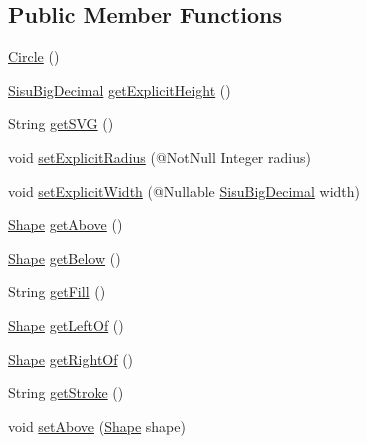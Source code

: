 \subsection*{Public Member Functions}
\begin{DoxyCompactItemize}
\item 
\hyperlink{classcom_1_1aarrelaakso_1_1drawl_1_1_circle_a18cd01a953d72d49941bc8211f50d268}{Circle} ()
\item 
\hyperlink{classcom_1_1aarrelaakso_1_1drawl_1_1_sisu_big_decimal}{Sisu\+Big\+Decimal} \hyperlink{classcom_1_1aarrelaakso_1_1drawl_1_1_circle_a31a2fa475820117ecfbb5c9cd839f0f4}{get\+Explicit\+Height} ()
\item 
String \hyperlink{classcom_1_1aarrelaakso_1_1drawl_1_1_circle_adc826cc2d93eb4e78318035c86d00f03}{get\+S\+VG} ()
\item 
void \hyperlink{classcom_1_1aarrelaakso_1_1drawl_1_1_circle_af34a59acf0e1fc33777aca1b9be7b23d}{set\+Explicit\+Radius} (@Not\+Null Integer radius)
\item 
void \hyperlink{classcom_1_1aarrelaakso_1_1drawl_1_1_circle_a6b4fd174602db84c42763606abfdd98a}{set\+Explicit\+Width} (@Nullable \hyperlink{classcom_1_1aarrelaakso_1_1drawl_1_1_sisu_big_decimal}{Sisu\+Big\+Decimal} width)
\item 
\hyperlink{classcom_1_1aarrelaakso_1_1drawl_1_1_shape}{Shape} \hyperlink{classcom_1_1aarrelaakso_1_1drawl_1_1_shape_acebea2aa57031322323c9bf50ee447db}{get\+Above} ()
\item 
\hyperlink{classcom_1_1aarrelaakso_1_1drawl_1_1_shape}{Shape} \hyperlink{classcom_1_1aarrelaakso_1_1drawl_1_1_shape_a53de5ab609d879719cd3b372dfe8df58}{get\+Below} ()
\item 
String \hyperlink{classcom_1_1aarrelaakso_1_1drawl_1_1_shape_a0d9a33a3e151aaceeec140bea343a650}{get\+Fill} ()
\item 
\hyperlink{classcom_1_1aarrelaakso_1_1drawl_1_1_shape}{Shape} \hyperlink{classcom_1_1aarrelaakso_1_1drawl_1_1_shape_a2b19d5964ac46d545a7bae3133df6532}{get\+Left\+Of} ()
\item 
\hyperlink{classcom_1_1aarrelaakso_1_1drawl_1_1_shape}{Shape} \hyperlink{classcom_1_1aarrelaakso_1_1drawl_1_1_shape_a1ad573b06f341aa79f6a255a476ae6e4}{get\+Right\+Of} ()
\item 
String \hyperlink{classcom_1_1aarrelaakso_1_1drawl_1_1_shape_a4e1d54c7e161e3af5053939ddefdf9e6}{get\+Stroke} ()
\item 
void \hyperlink{classcom_1_1aarrelaakso_1_1drawl_1_1_shape_a942b3cf3365498dc1ac6b0309ce33b86}{set\+Above} (\hyperlink{classcom_1_1aarrelaakso_1_1drawl_1_1_shape}{Shape} shape)

\end{DoxyCompactItemize}
